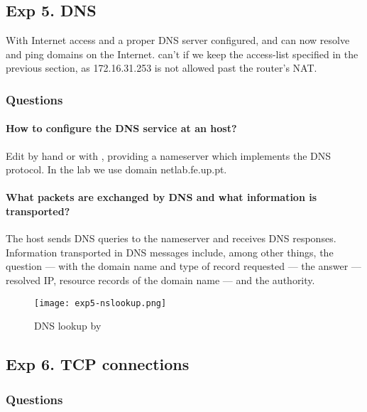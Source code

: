 \documentclass[compilation.tex]{subfiles}
\begin{document}
\subsection[DNS]{Exp 5. DNS}
\label{exp:5}

With Internet access and a proper DNS server configured,  and  can now resolve and ping domains on the Internet.  can't if we keep the access-list specified in the previous section, as 172.16.31.253 is not allowed past the router's NAT.

\subsubsection{Questions}
\label{subsubsec:exp5questions}

\paragraph{How to configure the DNS service at an host?}
Edit  by hand or with , providing a nameserver which implements the DNS protocol. In the lab we use domain netlab.fe.up.pt.

\paragraph{What packets are exchanged by DNS and what information is transported?}
The host sends DNS queries to the nameserver and receives DNS responses. Information transported in DNS messages include, among other things, the question --- with the domain name and type of record requested --- the answer --- resolved IP, resource records of the domain name --- and the authority.

\begin{figure}[htb]
\centering
\texttt{[image: exp5-nslookup.png]}
\caption{DNS lookup by }
\label{fig:exp5-nslookup}
\end{figure}

\subsection[TCP connections]{Exp 6. TCP connections}
\label{exp:6}

\subsubsection{Questions}
\label{subsubsec:exp6questions}
\end{document}
